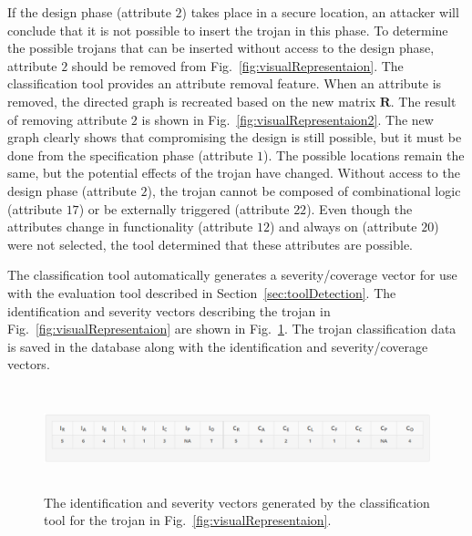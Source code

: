 If the design phase (attribute $2$) takes place in a secure location, an attacker will conclude that
it is not possible to insert the trojan in this phase.
To determine the possible trojans that can be inserted without access to the design phase,
attribute $2$ should be removed from Fig.~\ref{fig:visualRepresentaion}.
The classification tool provides an attribute removal feature.
When an attribute is removed, the directed graph is recreated based on the new matrix $\mathbf{R}$.
The result of removing attribute $2$ is shown in Fig.~\ref{fig:visualRepresentaion2}.
The new graph clearly shows that compromising the design is still possible, but it must be done from the specification phase (attribute $1$).
The possible locations remain the same, but the potential effects of the trojan have changed.
Without access to the design phase (attribute $2$), the trojan cannot be composed of combinational logic (attribute $17$) or be externally triggered (attribute $22$).
Even though the attributes change in functionality (attribute $12$) and always on (attribute $20$) were not selected,
the tool determined that these attributes are possible.

The classification tool automatically generates a severity/coverage vector for use with the evaluation tool described in Section~\ref{sec:toolDetection}.
The identification and severity vectors describing the trojan in Fig.~\ref{fig:visualRepresentaion} are shown in Fig.~\ref{fig:classificationSeverity}.
The trojan classification data is saved in the database along with the identification and severity/coverage vectors.
\begin{figure}
	\centering
	\includegraphics[width=1\linewidth, height = 3cm]{figures/classificationSeverity}
	\caption{The identification and severity vectors generated by the classification tool for the trojan in Fig.~\ref{fig:visualRepresentaion}.}
	\label{fig:classificationSeverity}
\end{figure}

